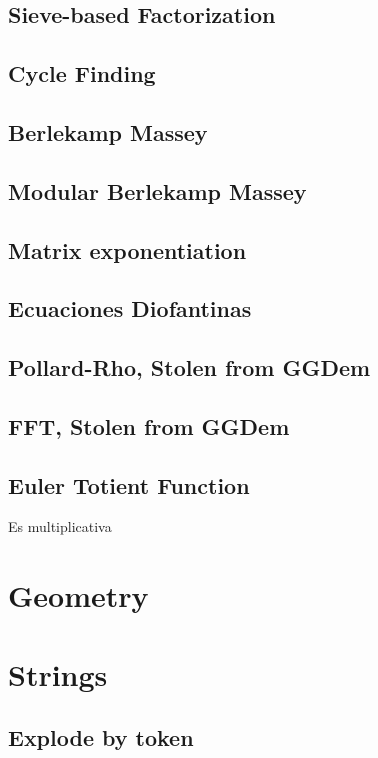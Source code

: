 \subsection{Sieve-based Factorization}
\subsection{Cycle Finding}
\subsection{Berlekamp Massey}
\subsection{Modular Berlekamp Massey}
\subsection{Matrix exponentiation}
\subsection{Ecuaciones Diofantinas}
\subsection{Pollard-Rho, Stolen from GGDem}
\subsection{FFT, Stolen from GGDem}
\subsection{Euler Totient Function}
Es multiplicativa
\section{Geometry}


\section{Strings}
\subsection{Explode by token}
